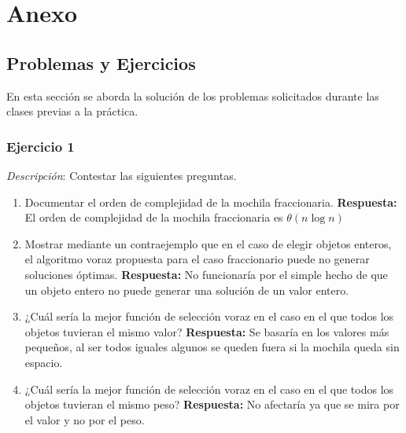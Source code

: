 \chapter{Anexo}

    \section{Problemas y Ejercicios}
        En esta sección se aborda la solución de los problemas solicitados durante las clases previas a la práctica. 

        \subsection{Ejercicio 1}
            \textit{Descripción}: Contestar las siguientes preguntas.

            \begin{enumerate}
                \item Documentar el orden de complejidad de la mochila fraccionaria.
                \textbf{Respuesta:} El orden de complejidad de la mochila fraccionaria es \(\theta(n\log{n})\)
                \item Mostrar mediante un contraejemplo que en el caso de elegir objetos enteros, el algoritmo voraz propuesta para el caso fraccionario puede no generar soluciones óptimas.
                \textbf{Respuesta:} No funcionaría por el simple hecho de que un objeto entero no puede generar una solución de un valor entero. 
                \item ¿Cuál sería la mejor función de selección voraz en el caso en el que todos los objetos tuvieran el mismo valor?
                \textbf{Respuesta:} Se basaría en los valores más pequeños, al ser todos iguales algunos se queden fuera si la mochila queda sin espacio.
                \item ¿Cuál sería la mejor función de selección voraz en el caso en el que todos los objetos tuvieran el mismo peso?
                \textbf{Respuesta:} No afectaría ya que se mira por el valor y no por el peso. 
                
            \end{enumerate}
            
            

            

        \newpage
